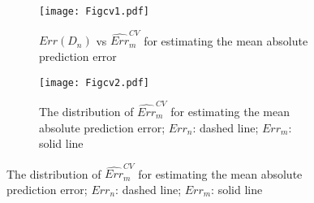 \documentclass[12pt]{article}
\begin{document}
\begin{figure}
\centering
\begin{subfigure}[b]{0.45\textwidth}
\centering
\texttt{[image: Figcv1.pdf]}
\caption{$Err(D_n)$ vs $\widehat{Err}^{CV}_m$ for estimating the mean absolute prediction error}
\label{fig:errscatter}
\end{subfigure}
\hfill
\begin{subfigure}[b]{0.45\textwidth}
\centering
\texttt{[image: Figcv2.pdf]}
\caption{The distribution of $\widehat{Err}^{CV}_m$ for estimating the mean absolute prediction error; $Err_n$: dashed line; $Err_m$: solid line}
\label{fig:errdist}
\end{subfigure}


\end{figure}
\end{document}
